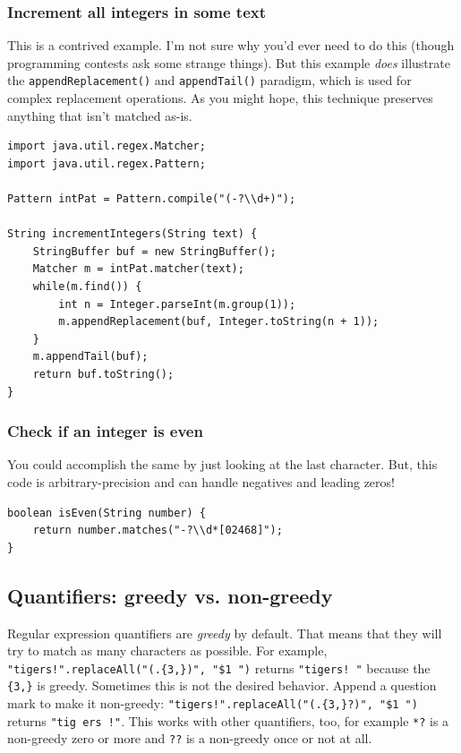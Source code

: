 \documentclass[a4paper,12pt]{article}
\begin{document}
\subsubsection{Increment all integers in some text}
This is a contrived example. I'm not sure why you'd ever need to do this (though programming contests ask some strange things). But this example {\em does} illustrate the \verb/appendReplacement()/ and \verb/appendTail()/ paradigm, which is used for complex replacement operations. As you might hope, this technique preserves anything that isn't matched as-is.
\begin{lstlisting}
import java.util.regex.Matcher;
import java.util.regex.Pattern;

Pattern intPat = Pattern.compile("(-?\\d+)");

String incrementIntegers(String text) {
	StringBuffer buf = new StringBuffer();
	Matcher m = intPat.matcher(text);
	while(m.find()) {
		int n = Integer.parseInt(m.group(1));
		m.appendReplacement(buf, Integer.toString(n + 1));
	}
	m.appendTail(buf);
	return buf.toString();
}
\end{lstlisting}

\subsubsection{Check if an integer is even}
You could accomplish the same by just looking at the last character. But, this code is arbitrary-precision and can handle negatives and leading zeros!
\begin{lstlisting}
boolean isEven(String number) {
	return number.matches("-?\\d*[02468]");
}
\end{lstlisting}

\subsection{Quantifiers: greedy vs. non-greedy}
Regular expression quantifiers are {\em greedy} by default. That means that they will try to match as many characters as possible. For example, \verb/"tigers!".replaceAll("(.{3,})", "$1 ")/ returns \verb/"tigers! "/ because the \verb/{3,}/ is greedy. Sometimes this is not the desired behavior. Append a question mark to make it non-greedy: \verb/"tigers!".replaceAll("(.{3,}?)", "$1 ")/ returns \verb/"tig ers !"/. This works with other quantifiers, too, for example \verb/*?/ is a non-greedy zero or more and \verb/??/ is a non-greedy once or not at all.
\end{document}
